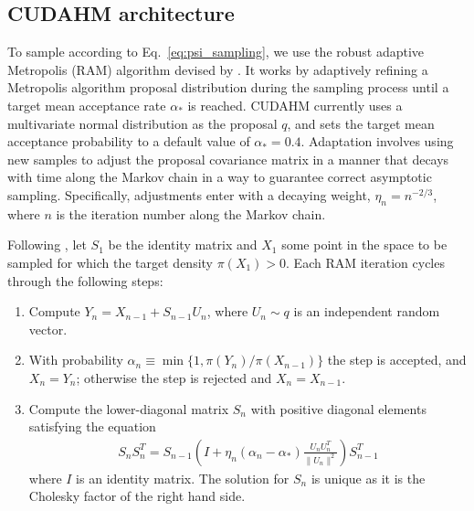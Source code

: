 \subsection{CUDAHM architecture}
\label{sec:arch}

To sample according to Eq.~\ref{eq:psi_sampling}, we use the robust adaptive Metropolis (RAM) algorithm devised by \cite{vihola2012robust}.
It works by adaptively refining a Metropolis algorithm proposal distribution during the sampling process until a target mean acceptance rate $\alpha_*$ is reached.
CUDAHM currently uses a multivariate normal distribution as the proposal $q$, and sets the target mean acceptance probability to a default value of $\alpha_{*}=0.4$.
Adaptation involves using new samples to adjust the proposal covariance matrix in a manner that decays with time along the Markov chain in a way to guarantee correct asymptotic sampling.
Specifically, adjustments enter with a decaying weight, $\eta_{n}=n^{-2/3}$, where $n$ is the iteration number along the Markov chain.

Following \cite{vihola2012robust}, let $S_{1}$ be the identity matrix and $X_{1}$ some point in the space to be sampled for which the target density $\pi(X_{1})>0$.
Each RAM iteration cycles through the following steps: 
\begin{enumerate} \item Compute $Y_{n}=X_{n-1}+S_{n-1}U_{n}$, where $U_{n}\sim q$ is an independent random vector.
\item With probability $\alpha_{n} \equiv \min\{1,\pi(Y_{n})/\pi(X_{n-1})\}$ the step is accepted, and $X_{n}=Y_{n}$; otherwise the step is rejected and $X_{n}=X_{n-1}$.
\item Compute the lower-diagonal matrix $S_{n}$ with positive diagonal elements satisfying the equation
\begin{align}
S_{n}S_{n}^{T}=S_{n-1}\left(I+\eta_{n}(\alpha_{n}-\alpha_{*})\frac{U_{n}U_{n}^{T}}{\parallel U_{n}\parallel^{2}}\right)S_{n-1}^{T}
\end{align}
where $I$ is an identity matrix.
The solution for $S_{n}$ is unique as it is the Cholesky factor of the right hand side.
\end{enumerate}


